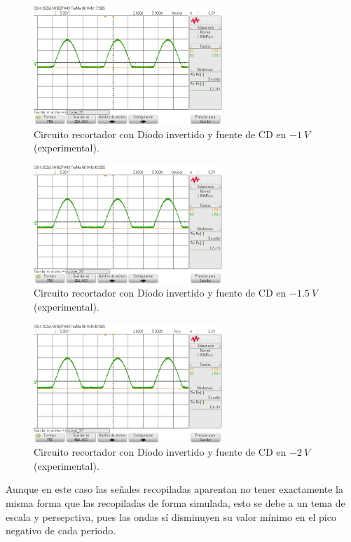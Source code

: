 \documentclass[journal]{IEEEtran}
\begin{document}
\begin{figure}[H]
        \centering
        \includegraphics[width=2.8in]{SignalExperimental_17.png}
        \caption{Circuito recortador con Diodo invertido y fuente de CD en $-1~V$ (experimental).}
        \label{fig:SignalExperimental_18}
\end{figure}
\begin{figure}[H]
        \centering
        \includegraphics[width=2.8in]{SignalExperimental_18.png}
        \caption{Circuito recortador con Diodo invertido y fuente de CD en $-1.5~V$ (experimental).}
        \label{fig:SignalExperimental_19}
\end{figure}
\begin{figure}[H]
        \centering
        \includegraphics[width=2.8in]{SignalExperimental_19.png}
        \caption{Circuito recortador con Diodo invertido y fuente de CD en $-2~V$ (experimental).}
        \label{fig:SignalExperimental_20}
\end{figure}

Aunque en este caso las señales recopiladas aparentan no tener exactamente la misma forma que las recopiladas de forma simulada,
esto se debe a un tema de escala y persepctiva, pues las ondas sí disminuyen su valor mínimo en el pico negativo de cada periodo.
\end{document}
